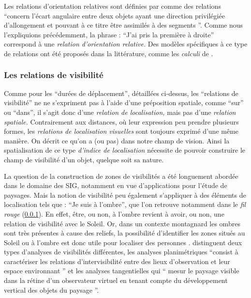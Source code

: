 
Les relations d'orientation relatives sont définies par
\textcite{Duchene2019} comme des relations
\enquote{concern l'écart angulaire entre deux objets
  ayant une direction privilégiée d'allongement et pouvant à ce titre
  être assimilés à des segments \textelp{}}. Comme nous l'expliquions
précédemment, la phrase : \enquote{J'ai pris la première à droite}
correspond à une \emph{relation d'orientation relative.} Des modèles
spécifiques à ce type de relations ont été proposés dans la
littérature, comme les \emph{calculi} de
\textcite{Schlider1995,Isli2000}.

\subsubsection{Les relations de visibilité}

Comme pour les \enquote{durées de déplacement}, détaillées ci-dessus,
les \enquote{relations de visibilité} ne ne s'expriment pas à l'aide
d'une préposition spatiale, comme \enquote{sur} ou \enquote{dans}, il
s'agit donc d'une \emph{relation de localisation,} mais pas d'une
\emph{relation spatiale.} Contrairement aux distances, où leur
expression peu prendre plusieurs formes, les \emph{relations de
  localisation visuelles} sont toujours exprimé d'une même manière. On
décrit ce qu'on a (ou pas) dans notre champ de vision. Ainsi la
spatialisation de ce type \emph{d'indice de localisation} nécessite de
pouvoir construire le champ de visibilité d'un objet, quelque soit sa
nature.

La question de la construction de zones de visibilités a été
longuement abordée dans le domaine des SIG, notamment en vue
d’applications pour l'étude de paysages. Mais la notion de visibilité
peu également s'appliquer à des éléments de localisation tels que :
\enquote{Je suis à l'ombre}, que l'on retrouve notamment dans le
\emph{fil rouge} (\ref{}). En effet, être, ou non, à l'ombre revient à
avoir, ou non, une relation de visibilité avec le Soleil. Or, dans un
contexte montagnard les ombres sont très présentes à cause des
reliefs, la possibilité d'identifier les zones situés au Soleil ou à
l'ombre est donc utile pour localiser des personnes
\autocite{Houpert2003}. \textcite{Sahraoui2016} distinguent deux types
d'analyses de visibilités différentes, les analyses planimétriques
\enquote{consist à caractériser les relations
  d’intervisibilité entre des lieux d’observation et leur espace
  environnant \textelp{}} et les analyses tangentielles qui
\enquote{\textelp{} mesur le paysage visible dans la
  rétine d’un observateur virtuel en tenant compte du développement
  vertical des objets du paysage \textelp{}}.

